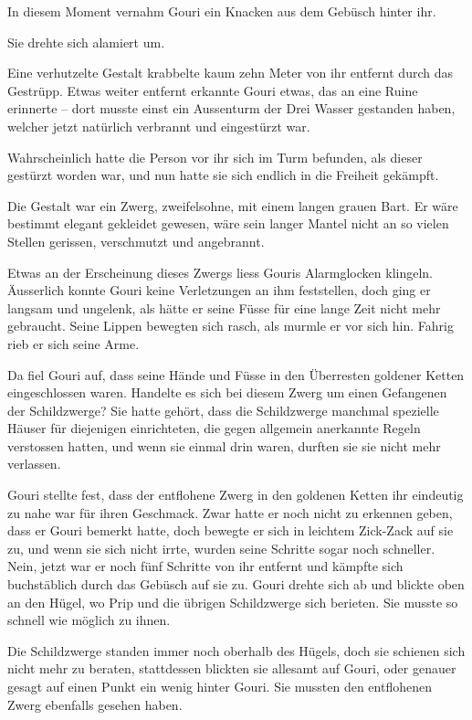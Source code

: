 In diesem Moment vernahm Gouri ein Knacken aus dem Gebüsch hinter ihr.

Sie drehte sich alamiert um.

Eine verhutzelte Gestalt krabbelte kaum zehn Meter von ihr entfernt durch das Gestrüpp. Etwas weiter entfernt erkannte Gouri etwas, das an eine Ruine erinnerte – dort musste einst ein Aussenturm der Drei Wasser gestanden haben, welcher jetzt natürlich verbrannt und eingestürzt war.

Wahrscheinlich hatte die Person vor ihr sich im Turm befunden, als dieser gestürzt worden war, und nun hatte sie sich endlich in die Freiheit gekämpft.

Die Gestalt war ein Zwerg, zweifelsohne, mit einem langen grauen Bart. Er wäre bestimmt elegant gekleidet gewesen, wäre sein langer Mantel nicht an so vielen Stellen gerissen, verschmutzt und angebrannt.

Etwas an der Erscheinung dieses Zwergs liess Gouris Alarmglocken klingeln. Äusserlich konnte Gouri keine Verletzungen an ihm feststellen, doch ging er langsam und ungelenk, als hätte er seine Füsse für eine lange Zeit nicht mehr gebraucht. Seine Lippen bewegten sich rasch, als murmle er vor sich hin. Fahrig rieb er sich seine Arme.

Da fiel Gouri auf, dass seine Hände und Füsse in den Überresten goldener Ketten eingeschlossen waren. Handelte es sich bei diesem Zwerg um einen Gefangenen der Schildzwerge? Sie hatte gehört, dass die Schildzwerge manchmal spezielle Häuser für diejenigen einrichteten, die gegen allgemein anerkannte Regeln verstossen hatten, und wenn sie einmal drin waren, durften sie sie nicht mehr verlassen.

Gouri stellte fest, dass der entflohene Zwerg in den goldenen Ketten ihr eindeutig zu nahe war für ihren Geschmack. Zwar hatte er noch nicht zu erkennen geben, dass er Gouri bemerkt hatte, doch bewegte er sich in leichtem Zick-Zack auf sie zu, und wenn sie sich nicht irrte, wurden seine Schritte sogar noch schneller. Nein, jetzt war er noch fünf Schritte von ihr entfernt und kämpfte sich buchstäblich durch das Gebüsch auf sie zu. Gouri drehte sich ab und blickte oben an den Hügel, wo Prip und die übrigen Schildzwerge sich berieten. Sie musste so schnell wie möglich zu ihnen.

Die Schildzwerge standen immer noch oberhalb des Hügels, doch sie schienen sich nicht mehr zu beraten, stattdessen blickten sie allesamt auf Gouri, oder genauer gesagt auf einen Punkt ein wenig hinter Gouri. Sie mussten den entflohenen Zwerg ebenfalls gesehen haben.

